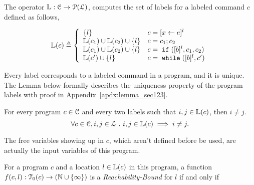 The operator $\mathbb{L}: \mathcal{C} \to \mathcal{P}(\mathcal{L})$,
computes the set of labels
for a labeled command $c$ defined as follows,
\begin{defn}
\label{def:lvar}
{\small
$$
  \lvar(c) \triangleq
  \left\{
  \begin{array}{ll}
      \{l\}                  
      & {c} = [{\assign x e}]^{l} 
      \\
      \lvar({c_1}) \cup \lvar({{c_2}})  \cup \{l\} 
      & {c} = {c_1};{c_2}
      \\
      \lvar(c_1) \cup \lvar({{c_2}}) \cup \{l\} 
      & {c} =\eif([\bexpr]^{l}, c_1, c_2) 
      \\
      \lvar({{c}'}) \cup \{l\} 
      & {c}   = \ewhile ([\bexpr]^{l}, {c}')
\end{array}
\right.
$$
}
\end{defn}
%
Every label corresponds to a labeled command in a program, and it is unique.
The Lemma below formally describes the uniqueness property of the program labels
with proof in Appendix~\ref{apdx:lemma_sec123}.
\begin{lem}
  \label{lem:label_unique}
  For every program $c \in \mathcal{C}$ and every two labels such that
  $i, j \in \mathbb{L}(c)$, then $i \neq j$.
  \[
    \forall c \in \mathcal{C}, i, j \in \mathcal{L} ~.~ i, j \in \mathbb{L}(c)\implies i \neq j.
    \]
\end{lem}
%
The free variables
showing up in $c$, which aren't defined before be used, are actually the input variables of this program.
%
\begin{defn}
  \label{def:rb}
  For a program ${c}$ and a location $l \in \mathbb{L}(c)$ in this program,
a function $f(c, l) : \mathcal{T}_0(c) \to (\mathbb{N} \cup \{\infty\})$ is a \emph{Reachability-Bound} for $l$ if and only if
\end{defn}

